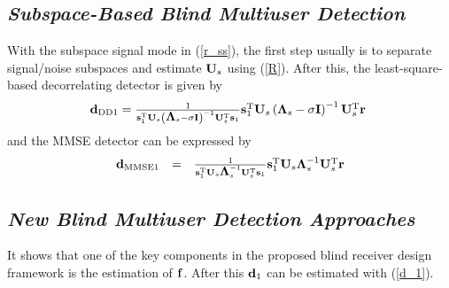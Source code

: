 \documentclass[a4paper,10pt,fleqn, twocolumn]{IEEETran}
\newcommand{\br}{{\mathbf r}}
\newcommand{\bd}{{\bf d}}
\newcommand{\bs}{{\bf s}}
\newcommand{\bbf}{{\bf f}}
\newcommand{\bI}{{\bf I}}
\newcommand{\bU}{{\bf U}}
\newcommand{\bLambda}{{\mbox {\boldmath $\Lambda$}}}
\begin{document}
\subsection{\em Subspace-Based Blind Multiuser Detection}
With the subspace signal mode in (\ref{r_ss}), the first step
usually is to separate signal/noise subspaces and estimate
$\bU_{s}$ using (\ref{R}). After this, the least-square-based
decorrelating detector is given by
\begin{equation}\hspace{-0.05in}
\begin{array}{l}
\bd_{\rm DD1}=\frac{1}{\bs_1^{\rm
T}\bU_{s}\left(\bLambda_{s}-\sigma\bI\right)^{-1}\bU_{s}^{\rm
T}\bs_{1}}\bs_{1}^{\rm
T}\bU_{s}\left(\bLambda_{s}-\sigma\bI\right)^{-1}\bU_{s}^{\rm
T}\br
\end{array}
\end{equation}
\noindent and the MMSE detector can be expressed by
\begin{equation}
\begin{array}{rcl}
\bd_{\rm MMSE1}&=&\frac{1}{\bs_1^{\rm
T}\bU_{s}\bLambda_{s}^{-1}\bU_{s}^{\rm T}\bs_{1}}\bs_{1}^{\rm
T}\bU_{s}\bLambda_{s}^{-1}\bU_{s}^{\rm T}\br
\end{array}
\end{equation}
\subsection{\em New Blind Multiuser Detection Approaches}
It shows that one of the key components in the proposed blind
receiver design framework is the estimation of $\bbf$. After this
$\bd_1$ can be estimated with (\ref{d_1}).
\end{document}
